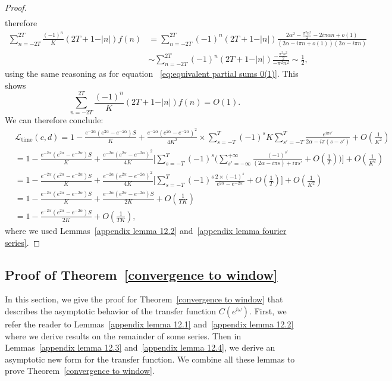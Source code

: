\begin{proof}
\begin{align*}
\end{align*}
therefore
\begin{align*}
\sum_{n=-2T}^{2T}\frac{(-1)^n}{K} (2T+1-\vert n\vert)f(n) &= \sum_{n=-2T}^{2T}(-1)^n (2T+1-\vert n\vert) \frac{2\alpha^2-\frac{\pi^2n^2}{2}-2i\pi\alpha n+o(1)}{(2\alpha - i\pi n +o(1))(2\alpha - i\pi n)}\\
&\sim\sum_{n=-2T}^{2T}(-1)^n(2T+1-\vert n\vert)\frac{-\frac{\pi^2n^2}{2}}{-\pi^2n^2}\sim\frac{1}{2},
\end{align*}
using the same reasoning as for equation ~\eqref{eq:equivalent partial sums 0(1)}.
This shows 
\begin{equation}\label{O(1) intermediate}
    \sum_{n=-2T}^{2T}\frac{(-1)^n}{K}(2T+1-\vert n\vert)f(n) = O(1).
\end{equation}
We can therefore conclude:
\begin{align*}
    &\mathcal{L}_{\text{time}}(c,d) = 1 - \frac{e^{-2\alpha}(e^{2\alpha}-e^{-2\alpha})S}{K} + \frac{e^{-2\alpha}(e^{2\alpha}-e^{-2\alpha})^2}{4K^2}\times\sum_{s=-T}^T(-1)^sK\sum_{s'=-T}^T\frac{e^{i\pi s'}}{2\alpha - i\pi(s-s')} + O(\frac{1}{K^2})\\
    &=1 - \frac{e^{-2\alpha}(e^{2\alpha}-e^{-2\alpha})S}{K} + \frac{e^{-2\alpha}(e^{2\alpha}-e^{-2\alpha})^2}{4K}\big[\sum_{s=-T}^T(-1)^s\big(\sum_{s'=-\infty}^{+\infty}\frac{(-1)^{s'}}{(2\alpha-i\pi s)+i\pi s'} + O(\frac{1}{T})\big)\big] + O(\frac{1}{K^2})\\
    &=1 - \frac{e^{-2\alpha}(e^{2\alpha}-e^{-2\alpha})S}{K} + \frac{e^{-2\alpha}(e^{2\alpha}-e^{-2\alpha})^2}{4K}\big[\sum_{s=-T}^T(-1)^s\frac{2\times(-1)^s}{e^{2\alpha}-e^{-2\alpha}} +O(\frac{1}{T})\big] + O(\frac{1}{K^2})\\
    &= 1 - \frac{e^{-2\alpha}(e^{2\alpha}-e^{-2\alpha})S}{K} + \frac{e^{-2\alpha}(e^{2\alpha}-e^{-2\alpha})S}{2K} + O(\frac{1}{TK})\\
    &=  1 - \frac{e^{-2\alpha}(e^{2\alpha}-e^{-2\alpha})S}{2K} + O(\frac{1}{TK}),
\end{align*}
where we used Lemmas~\ref{appendix lemma 12.2} and~\ref{appendix lemma fourier series}.
\end{proof}

\subsection{Proof of Theorem~\ref{convergence to window}}

In this section, we give the proof for Theorem~\ref{convergence to window} that describes the asymptotic behavior of the transfer function $C(e^{i\omega})$. First, we refer the reader to Lemmas~\ref{appendix lemma 12.1} and~\ref{appendix lemma 12.2} where we derive results on the remainder of some series. Then in Lemmas~\ref{appendix lemma 12.3} and~\ref{appendix lemma 12.4}, we derive an asymptotic new form for the transfer function. We combine all these lemmas to prove Theorem~\ref{convergence to window}.


